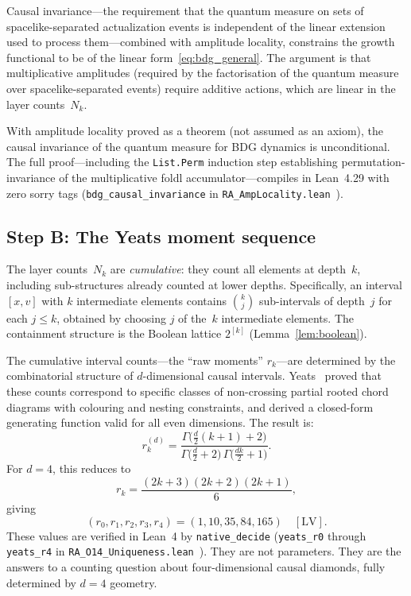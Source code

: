 \documentclass[12pt,a4paper]{article}
\begin{document}
Causal invariance---the requirement that the quantum measure on sets of spacelike-separated actualization events is independent of the linear extension used to process them---combined with amplitude locality, constrains the growth functional to be of the linear form~\eqref{eq:bdg_general}. The argument is that multiplicative amplitudes (required by the factorisation of the quantum measure over spacelike-separated events) require additive actions, which are linear in the layer counts~$N_k$.

With amplitude locality proved as a theorem (not assumed as an axiom), the causal invariance of the quantum measure for BDG dynamics is unconditional. The full proof---including the \texttt{List.Perm} induction step establishing permutation-invariance of the multiplicative foldl accumulator---compiles in Lean~4.29 with zero sorry tags (\texttt{bdg\_causal\_invariance} in \texttt{RA\_AmpLocality.lean}~\cite{AmpLocLean}).

\subsection{Step B: The Yeats moment sequence}\label{sec:yeats}

The layer counts~$N_k$ are \emph{cumulative}: they count all elements at depth~$k$, including sub-structures already counted at lower depths. Specifically, an interval $[x,v]$ with $k$ intermediate elements contains $\binom{k}{j}$ sub-intervals of depth~$j$ for each $j \leq k$, obtained by choosing $j$ of the~$k$ intermediate elements. The containment structure is the Boolean lattice $2^{[k]}$ (Lemma~\ref{lem:boolean}).

The cumulative interval counts---the ``raw moments'' $r_k$---are determined by the combinatorial structure of $d$-dimensional causal intervals. Yeats~\cite{Yeats2025} proved that these counts correspond to specific classes of non-crossing partial rooted chord diagrams with colouring and nesting constraints, and derived a closed-form generating function valid for all even dimensions. The result is:
\begin{equation}
r_k^{(d)} = \frac{\Gamma\!\bigl(\tfrac{d}{2}(k+1) + 2\bigr)}{\Gamma\!\bigl(\tfrac{d}{2}+2\bigr)\,\Gamma\!\bigl(\tfrac{dk}{2}+1\bigr)}.
\label{eq:yeats_general}
\end{equation}
For $d=4$, this reduces to
\begin{equation}
r_k = \frac{(2k+3)(2k+2)(2k+1)}{6},
\label{eq:yeats_d4}
\end{equation}
giving
\begin{equation}
(r_0, r_1, r_2, r_3, r_4) = (1, 10, 35, 84, 165) \quad[\text{LV}].
\label{eq:moments}
\end{equation}
These values are verified in Lean~4 by \texttt{native\_decide} (\texttt{yeats\_r0} through \texttt{yeats\_r4} in \texttt{RA\_O14\_Uniqueness.lean}~\cite{O14Lean}). They are not parameters. They are the answers to a counting question about four-dimensional causal diamonds, fully determined by $d=4$ geometry.
\end{document}
